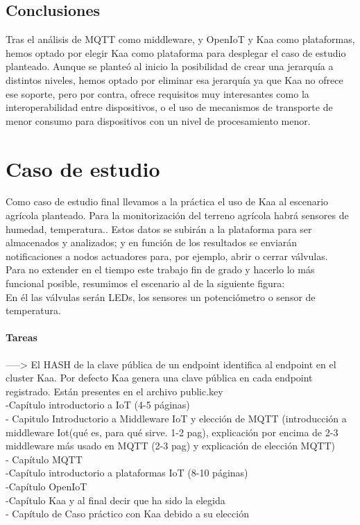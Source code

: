 \documentclass[12pt, twoside]{book}
\begin{document}
\section{Conclusiones}
Tras el análisis de MQTT como middleware, y OpenIoT y Kaa como plataformas, hemos optado por elegir Kaa como plataforma para desplegar el caso de estudio planteado. Aunque se planteó al inicio la posibilidad de crear una jerarquía a distintos niveles, hemos optado por eliminar esa jerarquía ya que Kaa no ofrece ese soporte, pero por contra, ofrece requisitos muy interesantes como la interoperabilidad entre dispositivos, o el uso de mecanismos de transporte de menor consumo para dispositivos con un nivel de procesamiento menor. \\ 
\chapter{Caso de estudio}
Como caso de estudio final llevamos a la práctica el uso de Kaa al escenario agrícola planteado. Para la monitorización del terreno agrícola habrá sensores de humedad, temperatura.. Estos datos se subirán a la plataforma para ser almacenados y analizados; y en función de los resultados se enviarán notificaciones a nodos actuadores para, por ejemplo, abrir o cerrar válvulas. \\
Para no extender en el tiempo este trabajo fin de grado y hacerlo lo más funcional posible, resumimos el escenario al de la siguiente figura:\\

En él las válvulas serán LEDs, los sensores un potenciómetro o sensor de temperatura. 
\subsubsection*{Tareas }
-----> El HASH de la clave pública de un endpoint identifica al endpoint en el cluster Kaa. Por defecto Kaa genera una clave pública en cada endpoint registrado. Están presentes en el archivo public.key\\


-Capítulo introductorio a IoT (4-5 páginas)\\
- Capitulo Introductorio a Middleware IoT y elección de MQTT (introducción a middleware Iot(qué es, para qué sirve. 1-2 pag), explicación por encima de 2-3 middleware más usado en MQTT (2-3 pag) y explicación de elección MQTT) \\
- Capítulo MQTT\\
-Capítulo introductorio a plataformas IoT (8-10 páginas)\\
-Capítulo OpenIoT\\
-Capítulo Kaa y al final decir que ha sido la elegida\\
- Capítulo de Caso práctico con Kaa debido a su elección
\end{document}
